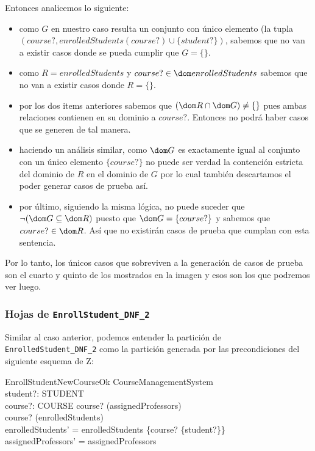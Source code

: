 \documentclass{article}
\begin{document}
Entonces analicemos lo siguiente: 

\begin{itemize}
    \item como $G$ en nuestro caso resulta un conjunto con único elemento (la tupla $(course?, enrolledStudents(course?) \cup \{student?\})$, sabemos que no van a existir casos donde se pueda cumplir que $G = \{\}$.
    \item como $R = enrolledStudents$ y $course? \in \dom enrolledStudents$ sabemos que no van a existir casos donde $R = \{\}$.
    \item por los dos items anteriores sabemos que $(\dom R \cap \dom G) \neq \{\}$ pues ambas relaciones contienen en su dominio a $course?$. Entonces no podrá haber casos que se generen de tal manera.
    \item haciendo un análisis similar, como $\dom G$ es exactamente igual al conjunto con un único elemento $\{course?\}$ no puede ser verdad la contención estricta del dominio de $R$ en el dominio de $G$ por lo cual también descartamos el poder generar casos de prueba así.
    \item por último, siguiendo la misma lógica, no puede suceder que $\lnot(\dom G \subseteq \dom R)$ puesto que $\dom G = \{course?\}$ y sabemos que $course? \in \dom R$. Así que no existirán casos de prueba que cumplan con esta sentencia.
\end{itemize}

Por lo tanto, los únicos casos que sobreviven a la generación de casos de prueba son el cuarto y quinto de los mostrados en la imagen y esos son los que podremos ver luego.

\subsubsection*{Hojas de \texttt{EnrollStudent\_DNF\_2}}

Similar al caso anterior, podemos entender la partición de \verb|EnrolledStudent_DNF_2| como la partición generada por las precondiciones del siguiente esquema de Z:

\begin{schema}{EnrollStudentNewCourseOk}
    \Delta CourseManagementSystem \\
    student?: STUDENT \\
    course?: COURSE
    \where
    course? \in \dom(assignedProfessors) \\
    course? \nin \dom(enrolledStudents) \\
    enrolledStudents' = enrolledStudents \cup \{course? \mapsto \{student?\}\} \\
    assignedProfessors' = assignedProfessors
\end{schema}
\end{document}
